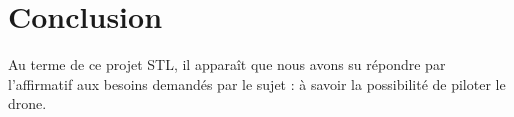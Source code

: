 \newpage
\section{Conclusion}

Au terme de ce projet STL, il apparaît que nous avons su répondre par l'affirmatif aux besoins demandés par le sujet : à savoir la possibilité de piloter le drone.